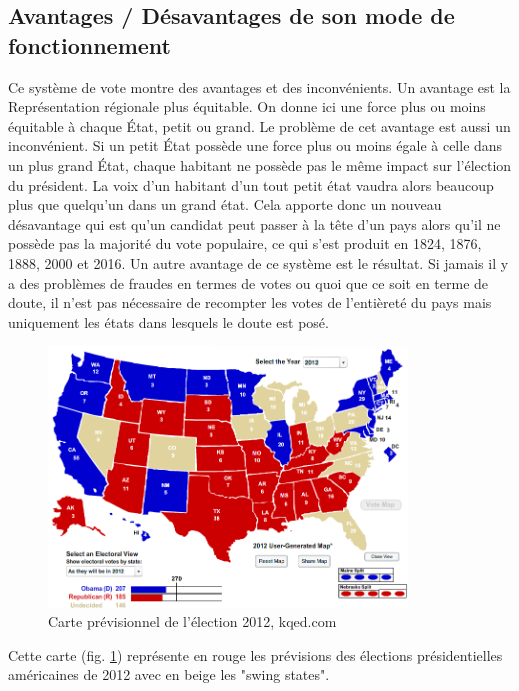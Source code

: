 \documentclass[11pt,a4paper]{report}
\begin{document}
\subsection{Avantages / Désavantages de son mode de fonctionnement} %
Ce système de vote montre des avantages et des inconvénients.
Un avantage est la Représentation régionale plus équitable.
On donne ici une force plus ou moins équitable à chaque État, petit ou grand.
Le problème de cet avantage est aussi un inconvénient.
Si un petit État possède une force plus ou moins égale à celle dans un plus grand État, chaque habitant ne possède pas le même impact sur l'élection du président.
La voix d’un habitant d’un tout petit état vaudra alors beaucoup plus que quelqu’un dans un grand état.
Cela apporte donc un nouveau désavantage qui est qu’un candidat peut passer à la tête d’un pays alors qu’il ne possède pas la majorité du vote populaire, ce qui s’est produit en 1824, 1876, 1888, 2000 et 2016.
Un autre avantage de ce système est le résultat.
Si jamais il y a des problèmes de fraudes en termes de votes ou quoi que ce soit en terme de doute, il n’est pas nécessaire de recompter les votes de l'entièreté du pays mais uniquement les états dans lesquels le doute est posé.

\begin{figure}[h]
	\centering
	\includegraphics[width=0.85\textwidth]{./images/2012-election.png}
	\caption{Carte prévisionnel de l'élection 2012, kqed.com \cite{kqed:map}}
	\label{map:uselec2012}
\end{figure}

Cette carte (fig. \ref{map:uselec2012}) représente en rouge les prévisions des élections présidentielles américaines de 2012 avec en beige les "swing states".
\end{document}
